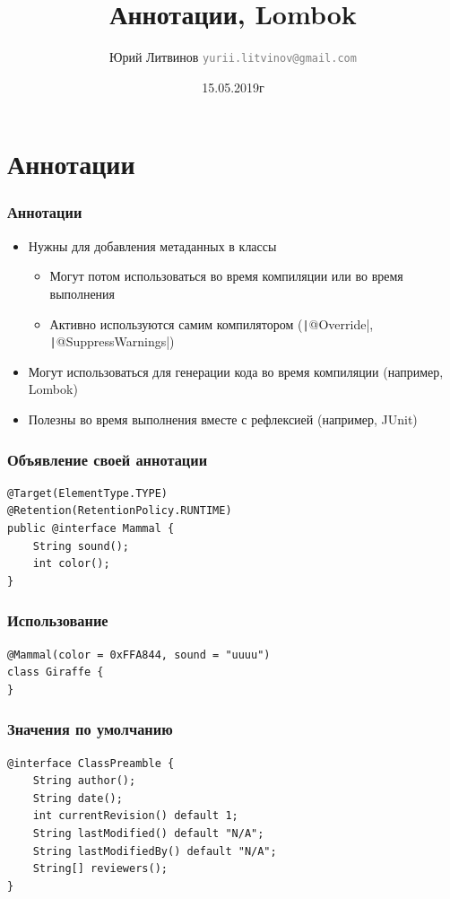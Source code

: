 \documentclass[xetex,mathserif,serif]{beamer}
\title{Аннотации, Lombok}
\author[Юрий Литвинов]{Юрий Литвинов \newline \textcolor{gray}{\small\texttt{yurii.litvinov@gmail.com}}}
\date{15.05.2019г}
\begin{document}
	
	\frame{\titlepage}

	\section{Аннотации}

	\begin{frame}
		\frametitle{Аннотации}
		\begin{itemize}
			\item Нужны для добавления метаданных в классы
			\begin{itemize}
				\item Могут потом использоваться во время компиляции или во время выполнения
				\item Активно используются самим компилятором (\texttt|@Override|, \texttt|@SuppressWarnings|)
			\end{itemize}
			\item Могут использоваться для генерации кода во время компиляции (например, Lombok)
			\item Полезны во время выполнения вместе с рефлексией (например, JUnit)
		\end{itemize}
	\end{frame}

	\begin{frame}[fragile]
		\frametitle{Объявление своей аннотации}
		\begin{verbatim}
@Target(ElementType.TYPE)
@Retention(RetentionPolicy.RUNTIME)
public @interface Mammal {
    String sound();
    int color();
}
		\end{verbatim}
	\end{frame}

	\begin{frame}[fragile]
		\frametitle{Использование}
		\begin{verbatim}
@Mammal(color = 0xFFA844, sound = "uuuu")
class Giraffe {
}
		\end{verbatim}
	\end{frame}

	\begin{frame}[fragile]
		\frametitle{Значения по умолчанию}
		\begin{verbatim}
@interface ClassPreamble {
    String author();
    String date();
    int currentRevision() default 1;
    String lastModified() default "N/A";
    String lastModifiedBy() default "N/A";
    String[] reviewers();
}
		\end{verbatim}
	\end{frame}
\end{document}
